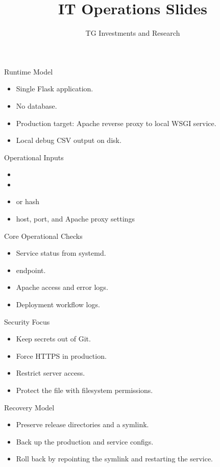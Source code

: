 \documentclass[aspectratio=169]{beamer}
\title{IT Operations Slides}
\subtitle{\product}
\author{TG Investments and Research}
\date{\docdate}
\begin{document}
\frame{\titlepage}

\begin{frame}{Runtime Model}
\begin{itemize}
    \item Single Flask application.
    \item No database.
    \item Production target: Apache reverse proxy to local WSGI service.
    \item Local debug CSV output on disk.
\end{itemize}
\end{frame}

\begin{frame}{Operational Inputs}
\begin{itemize}
    \item {}
    \item {}
    \item {} or hash
    \item host, port, and Apache proxy settings
\end{itemize}
\end{frame}

\begin{frame}{Core Operational Checks}
\begin{itemize}
    \item Service status from systemd.
    \item {} endpoint.
    \item Apache access and error logs.
    \item Deployment workflow logs.
\end{itemize}
\end{frame}

\begin{frame}{Security Focus}
\begin{itemize}
    \item Keep secrets out of Git.
    \item Force HTTPS in production.
    \item Restrict server access.
    \item Protect the  file with filesystem permissions.
\end{itemize}
\end{frame}

\begin{frame}{Recovery Model}
\begin{itemize}
    \item Preserve release directories and a  symlink.
    \item Back up the production  and service configs.
    \item Roll back by repointing the symlink and restarting the service.
\end{itemize}
\end{frame}
\end{document}

